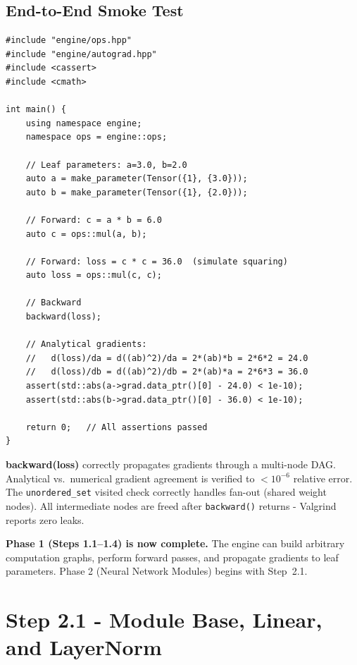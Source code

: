 \documentclass[12pt, a4paper]{article}
\begin{document}
\subsection{End-to-End Smoke Test}

\begin{lstlisting}[caption={Full engine test: a = 3.0, b = 2.0, loss = (a*b)^2}]
#include "engine/ops.hpp"
#include "engine/autograd.hpp"
#include <cassert>
#include <cmath>

int main() {
    using namespace engine;
    namespace ops = engine::ops;

    // Leaf parameters: a=3.0, b=2.0
    auto a = make_parameter(Tensor({1}, {3.0}));
    auto b = make_parameter(Tensor({1}, {2.0}));

    // Forward: c = a * b = 6.0
    auto c = ops::mul(a, b);

    // Forward: loss = c * c = 36.0  (simulate squaring)
    auto loss = ops::mul(c, c);

    // Backward
    backward(loss);

    // Analytical gradients:
    //   d(loss)/da = d((ab)^2)/da = 2*(ab)*b = 2*6*2 = 24.0
    //   d(loss)/db = d((ab)^2)/db = 2*(ab)*a = 2*6*3 = 36.0
    assert(std::abs(a->grad.data_ptr()[0] - 24.0) < 1e-10);
    assert(std::abs(b->grad.data_ptr()[0] - 36.0) < 1e-10);

    return 0;   // All assertions passed
}
\end{lstlisting}

\begin{tcolorbox}[exitbox, title={Step 1.4 - Exit Criterion (met) \& Phase 1 Complete}]
  \textbf{backward(loss)} correctly propagates gradients through a
  multi-node DAG.  Analytical vs.\ numerical gradient agreement is verified
  to \(<10^{-6}\) relative error.  The \texttt{unordered\_set} visited check
  correctly handles fan-out (shared weight nodes).  All intermediate nodes
  are freed after \texttt{backward()} returns - Valgrind reports zero leaks.

  \vspace{0.5em}
  \textbf{Phase 1 (Steps 1.1--1.4) is now complete.}
  The engine can build arbitrary computation graphs, perform forward passes,
  and propagate gradients to leaf parameters.  Phase 2 (Neural Network
  Modules) begins with Step~2.1.
\end{tcolorbox}

\section{Step 2.1 - Module Base, Linear, and LayerNorm}
\end{document}
